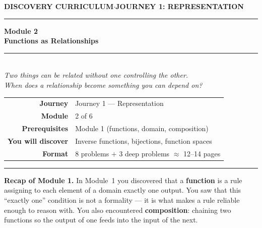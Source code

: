 \documentclass[12pt, a4paper]{article}
\newcounter{problem}
\begin{document}

\thispagestyle{empty}
\begin{center}
{\small\color{MidBlue}\textbf{DISCOVERY CURRICULUM}\quad$\cdot$\quad\textbf{JOURNEY 1: REPRESENTATION}}

\vspace{0.6cm}
{\color{NavyBlue}\rule{\linewidth}{2pt}}
\vspace{0.5cm}

{\Huge\bfseries\color{NavyBlue}Module 2}\\[0.3cm]
{\LARGE\bfseries\color{MidBlue}Functions as Relationships}\\[0.4cm]
{\color{Gold}\rule{0.4\linewidth}{1.2pt}}\\[0.4cm]
{\large\itshape\color{DarkGrey}Two things can be related without one controlling the other.\\[0.15cm]
When does a relationship become something you can depend on?}

\vspace{1cm}
\begin{tabular}{rl}
\color{DarkGrey}\textbf{Journey}           & Journey 1 --- Representation \\[4pt]
\color{DarkGrey}\textbf{Module}            & 2 of 6 \\[4pt]
\color{DarkGrey}\textbf{Prerequisites}     & Module 1 (functions, domain, composition) \\[4pt]
\color{DarkGrey}\textbf{You will discover} & Inverse functions, bijections, function spaces \\[4pt]
\color{DarkGrey}\textbf{Format}            & 8 problems $+$ 3 deep problems $\approx$ 12--14 pages \\
\end{tabular}

\vspace{1cm}
{\color{NavyBlue}\rule{\linewidth}{2pt}}
\end{center}

\vspace{0.6cm}

\noindent\textbf{Recap of Module 1.}
In Module~1 you discovered that a \textbf{function} is a rule assigning to each element of a domain exactly one output. You saw that this ``exactly one'' condition is not a formality --- it is what makes a rule reliable enough to reason with. You also encountered \textbf{composition}: chaining two functions so the output of one feeds into the input of the next.
\end{document}
